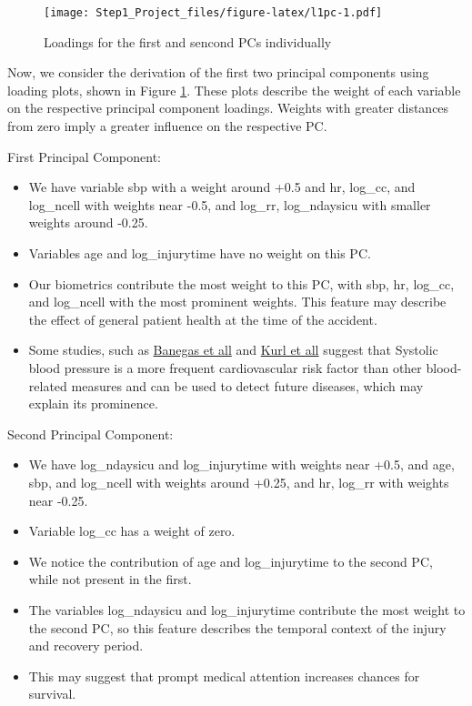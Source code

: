 \documentclass[
]{article}
\providecommand{\tightlist}{%
  \setlength{\itemsep}{0pt}\setlength{\parskip}{0pt}}
\begin{document}
\begin{figure}
\centering
\texttt{[image: Step1\_Project\_files/figure-latex/l1pc-1.pdf]}
\caption{Loadings for the first and sencond PCs
individually\label{fig:l1pc}}
\end{figure}

Now, we consider the derivation of the first two principal components
using loading plots, shown in Figure \ref{fig:l1pc}. These plots
describe the weight of each variable on the respective principal
component loadings. Weights with greater distances from zero imply a
greater influence on the respective PC.

First Principal Component:

\begin{itemize}
\tightlist
\item
  We have variable sbp with a weight around +0.5 and hr, log\_cc, and
  log\_ncell with weights near -0.5, and log\_rr, log\_ndaysicu with
  smaller weights around -0.25.
\item
  Variables age and log\_injurytime have no weight on this PC.
\item
  Our biometrics contribute the most weight to this PC, with sbp, hr,
  log\_cc, and log\_ncell with the most prominent weights. This feature
  may describe the effect of general patient health at the time of the
  accident.
\item
  Some studies, such as
  \href{https://pubmed.ncbi.nlm.nih.gov/11896505/}{Banegas et all} and
  \href{https://www.ahajournals.org/doi/full/10.1161/hs0901.095395}{Kurl
  et all} suggest that Systolic blood pressure is a more frequent
  cardiovascular risk factor than other blood-related measures and can
  be used to detect future diseases, which may explain its prominence.
\end{itemize}

Second Principal Component:

\begin{itemize}
\tightlist
\item
  We have log\_ndaysicu and log\_injurytime with weights near +0.5, and
  age, sbp, and log\_ncell with weights around +0.25, and hr, log\_rr
  with weights near -0.25.
\item
  Variable log\_cc has a weight of zero.
\item
  We notice the contribution of age and log\_injurytime to the second
  PC, while not present in the first.
\item
  The variables log\_ndaysicu and log\_injurytime contribute the most
  weight to the second PC, so this feature describes the temporal
  context of the injury and recovery period.
\item
  This may suggest that prompt medical attention increases chances for
  survival.
\end{itemize}
\end{document}
